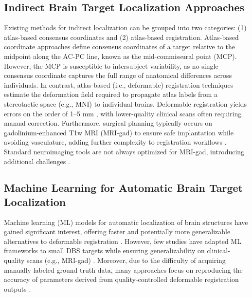 \subsection{Indirect Brain Target Localization Approaches}
Existing methods for indirect localization can be grouped into two categories: (1) atlas-based consensus coordinates and (2) atlas-based registration. Atlas-based coordinate approaches define consensus coordinates of a target relative to the midpoint along the AC-PC line, known as the mid-commissural point (MCP). However, the MCP is susceptible to intersubject variability, as no single consensus coordinate captures the full range of anatomical differences across individuals. In contrast, atlas-based (i.e., deformable) registration techniques estimate the deformation field required to propagate atlas labels from a stereotactic space (e.g., MNI) to individual brains. Deformable registration yields errors on the order of 1–5 mm \cite{Lau2019-eh, Abbass2022-lf, Miller2023-ct}, with lower-quality clinical scans often requiring manual correction. Furthermore, surgical planning typically occurs on gadolinium-enhanced T1w MRI (MRI-gad) to ensure safe implantation while avoiding vasculature, adding further complexity to registration workflows \cite{Abbass2022-lf, Abbass2025-el}. Standard neuroimaging tools are not always optimized for MRI-gad, introducing additional challenges \cite{Ogunsanya2024-uf, Warntjes2014-wy}.

\subsection{Machine Learning for Automatic Brain Target Localization}
Machine learning (ML) models for automatic localization of brain structures have gained significant interest, offering faster and potentially more generalizable alternatives to deformable registration \cite{Baniasadi2023-lm, Ren2025-zu}. However, few studies have adapted ML frameworks to small DBS targets while ensuring generalizability on clinical-quality scans (e.g., MRI-gad) \cite{Baniasadi2023-lm}. Moreover, due to the difficulty of acquiring manually labeled ground truth data, many approaches focus on reproducing the accuracy of parameters derived from quality-controlled deformable registration outputs \cite{Baniasadi2023-lm}.

